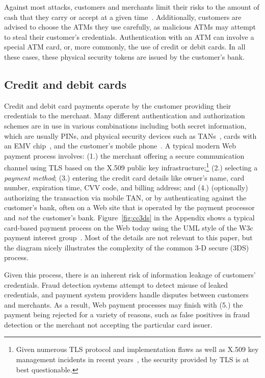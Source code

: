 \documentclass{IEEEtran}
\begin{document}
Against most attacks, customers and merchants limit their risks to the
amount of cash that they carry or accept at a given time~\cite{Bankrate}.
Additionally, customers are advised to choose the ATMs they use
carefully, as malicious ATMs may attempt to steal their customer's
credentials.  Authentication with an ATM can involve a special ATM
card, or, more commonly, the use of credit or debit cards.  In all these
cases, these physical security tokens are issued by the customer's
bank.


\subsection{Credit and debit cards}

Credit and debit card payments operate by the customer providing their
credentials to the merchant.  Many different
authentication and authorization schemes are in use in various
combinations including both secret information, which are usually PINs, and
physical security devices such as TANs~\cite{kobil2016tan}, cards with an EMV chip~\cite{emv}, and
 the customer's mobile phone~\cite{mtan}.
A typical modern Web payment process involves:
{(1.)} the merchant offering a secure communication channel
using TLS based on the X.509 public key infrastructure;\footnote{Given
numerous TLS protocol and implementation flaws as well as X.509 key
management incidents in recent years~\cite{holz2014}, the security
provided by TLS is at best questionable.}
{(2.)} selecting a {\em payment method};
{(3.)} entering the credit card details like owner's name,
 card number, expiration time, CVV code, and billing address; and
{(4.)} (optionally) authorizing the transaction via mobile TAN, or
 by authenticating against the customer's bank,
often on a Web site that is operated by the payment
processor and {\em not} the customer's bank.  Figure~\ref{fig:cc3ds} in the
Appendix shows a typical card-based payment process on the Web today using the
UML style of the W3c payment interest group~\cite{pigs}.  Most of the details
are not relevant to this paper, but the diagram nicely illustrates the
complexity of the common 3-D secure (3DS) process.

Given this process, there is an inherent risk of information leakage
of customers' credentials.  Fraud detection systems attempt to detect
misuse of leaked credentials, and payment system providers handle
disputes between customers and merchants.  As a result, Web payment
processes may finish with {(5.)} the payment being rejected for a
variety of reasons, such as false positives in fraud detection or
the merchant not accepting the particular card issuer.
\end{document}
